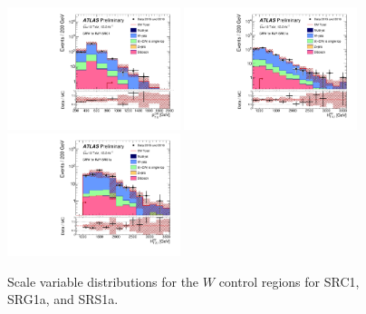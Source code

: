 \begin{figure}[tbp]
\begin{center}
\includegraphics[width=0.45\textwidth]{figures/ATLAS-CONF-2016-078_INT/N-1Plots/AtlasStyle/Preliminary/CRW_SRJigsawSRC1_LastCut_CRW_minusone}
\includegraphics[width=0.45\textwidth]{figures/ATLAS-CONF-2016-078_INT/N-1Plots/AtlasStyle/Preliminary/CRW_SRJigsawSRG1a_LastCut_CRW_minusone}
\includegraphics[width=0.45\textwidth]{figures/ATLAS-CONF-2016-078_INT/N-1Plots/AtlasStyle/Preliminary/CRW_SRJigsawSRS1a_LastCut_CRW_minusone}
\end{center}
\caption{Scale variable distributions for the $W$ control regions for SRC1, SRG1a, and SRS1a.}
\label{fig:CRW}
\end{figure}

